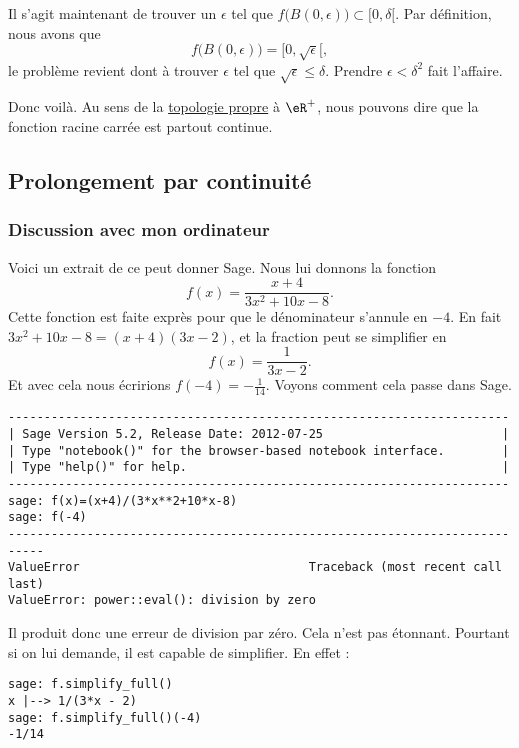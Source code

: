 Il s'agit maintenant de trouver un $\epsilon$ tel que $f\big( B(0,\epsilon) \big)\subset [0,\delta[$. Par définition, nous avons que
\[
  f\big( B(0,\epsilon) \big)=[0,\sqrt{\epsilon}[,
\]
le problème revient dont à trouver $\epsilon$ tel que $\sqrt{\epsilon}\leq\delta$. Prendre $\epsilon<\delta^2$ fait l'affaire.


Donc voilà. Au sens de la \href{http://fr.wikipedia.org/wiki/Topologie_induite}{topologie propre} à $\eR^+$, nous pouvons dire que la fonction racine carrée est partout continue.

\subsection{Prolongement par continuité}

\subsubsection{Discussion avec mon ordinateur}

Voici un extrait de ce peut donner Sage. Nous lui donnons la fonction
\begin{equation}    \label{EqyEHTBZ}
    f(x)=\frac{ x+4 }{ 3x^2+10x-8 }.
\end{equation}
Cette fonction est faite exprès pour que le dénominateur s'annule en \( -4\). En fait \( 3x^2+10x-8=(x+4)(3x-2)\), et la fraction peut se simplifier en
\begin{equation}
    f(x)=\frac{1}{ 3x-2 }.
\end{equation}
Et avec cela nous écririons \( f(-4)=-\frac{1}{ 14 }\). Voyons comment cela passe dans Sage.

\begin{verbatim}
----------------------------------------------------------------------
| Sage Version 5.2, Release Date: 2012-07-25                         |
| Type "notebook()" for the browser-based notebook interface.        |
| Type "help()" for help.                                            |
----------------------------------------------------------------------
sage: f(x)=(x+4)/(3*x**2+10*x-8)
sage: f(-4)
---------------------------------------------------------------------------
ValueError                                Traceback (most recent call last)
ValueError: power::eval(): division by zero
\end{verbatim}
Il produit donc une erreur de division par zéro. Cela n'est pas étonnant. Pourtant si on lui demande, il est capable de simplifier. En effet :
\begin{verbatim}
sage: f.simplify_full()
x |--> 1/(3*x - 2)
sage: f.simplify_full()(-4)
-1/14
\end{verbatim}

